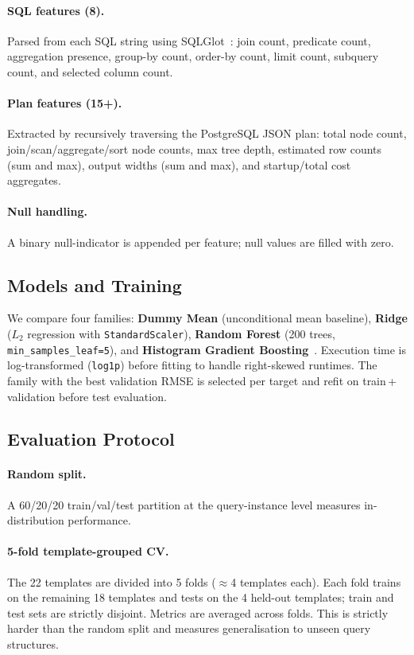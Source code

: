 \documentclass[runningheads]{llncs}
\begin{document}
\paragraph{SQL features (8).}
Parsed from each SQL string using SQLGlot~\cite{sqlglot}: join count,
predicate count, aggregation presence, group-by count, order-by count,
limit count, subquery count, and selected column count.

\paragraph{Plan features (15+).}
Extracted by recursively traversing the PostgreSQL JSON plan: total node
count, join/scan/aggregate/sort node counts, max tree depth, estimated
row counts (sum and max), output widths (sum and max), and startup/total
cost aggregates.

\paragraph{Null handling.}
A binary null-indicator is appended per feature; null values are filled
with zero.

\subsection{Models and Training}

We compare four families: \textbf{Dummy Mean} (unconditional mean
baseline), \textbf{Ridge} ($L_2$ regression with \texttt{StandardScaler}),
\textbf{Random Forest} (200 trees, \texttt{min\_samples\_leaf=5}), and
\textbf{Histogram Gradient Boosting}~\cite{sklearn}.
Execution time is log-transformed (\texttt{log1p}) before fitting to
handle right-skewed runtimes.
The family with the best validation RMSE is selected per target and
refit on train\,+\,validation before test evaluation.

\subsection{Evaluation Protocol}

\paragraph{Random split.}
A 60/20/20 train/val/test partition at the query-instance level measures
in-distribution performance.

\paragraph{5-fold template-grouped CV.}
The 22 templates are divided into 5 folds (${\approx}$4 templates each).
Each fold trains on the remaining 18 templates and tests on the 4
held-out templates; train and test sets are strictly disjoint.
Metrics are averaged across folds.
This is strictly harder than the random split and measures generalisation
to unseen query structures.
\end{document}
